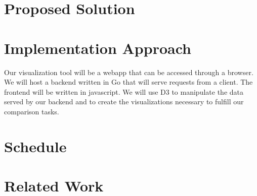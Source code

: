 \documentclass{article}
\begin{document}
\section{Proposed Solution}



\section{Implementation Approach}

Our visualization tool will be a webapp that can be accessed through a browser. We will host a backend written in Go that 
will serve requests from a client. The frontend will be written in javascript. We will use D3 to manipulate the data served
by our backend and to create the visualizations necessary to fulfill our comparison tasks.

\section{Schedule}

\section{Related Work}
\end{document}
